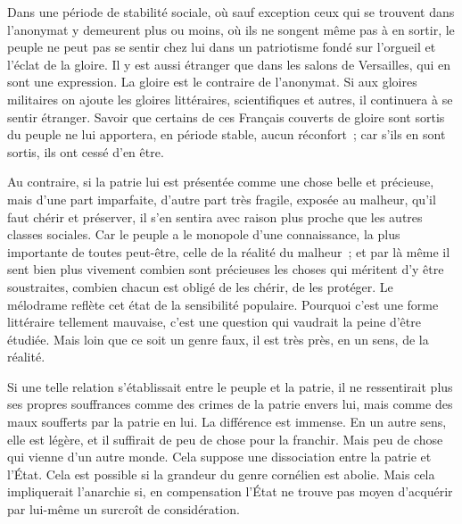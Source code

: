 \documentclass[french,twoside]{book} %
\begin{document}
Dans une période de stabilité sociale, où sauf exception ceux qui se trouvent dans l'anonymat y demeurent plus ou moins, où ils ne songent même pas à en sortir, le peuple ne peut pas se sentir chez lui dans un patriotisme fondé sur l'orgueil et l'éclat de la gloire. Il y est aussi étranger que dans les salons de Versailles, qui en sont une expression. La gloire est le contraire de l'anonymat. Si aux gloires militaires on ajoute les gloires littéraires, scientifiques et autres, il continuera à se sentir étranger. Savoir que certains de ces Français couverts de gloire sont sortis du peuple ne lui apportera, en période stable, aucun réconfort ; car s'ils en sont sortis, ils ont cessé d'en être.\par
Au contraire, si la patrie lui est présentée comme une chose belle et précieuse, mais d'une part imparfaite, d'autre part très fragile, exposée au malheur, qu'il faut chérir et préserver, il s'en sentira avec raison plus proche que les autres classes sociales. Car le peuple a le monopole d'une connaissance, la plus importante de toutes peut-être, celle de la réalité du malheur ; et par là même il sent bien plus vivement combien sont précieuses les choses qui méritent d'y être soustraites, combien chacun est obligé de les chérir, de les protéger. Le mélodrame reflète cet état de la sensibilité populaire. Pourquoi c'est une forme littéraire tellement mauvaise, c'est une question qui vaudrait la peine d'être étudiée. Mais loin que ce soit un genre faux, il est très près, en un sens, de la réalité.\par
Si une telle relation s'établissait entre le peuple et la patrie, il ne ressentirait plus ses propres souffrances comme des crimes de la patrie envers lui, mais comme des maux soufferts par la patrie en lui. La différence est immense. En un autre sens, elle est légère, et il suffirait de peu de chose pour la franchir. Mais peu de chose qui vienne d'un autre monde. Cela suppose une dissociation entre la patrie et l’État. Cela est possible si la grandeur du genre cornélien est abolie. Mais cela impliquerait l'anarchie si, en compensation l'État ne trouve pas moyen d'acquérir par lui-même un surcroît de considération.\par
\end{document}
